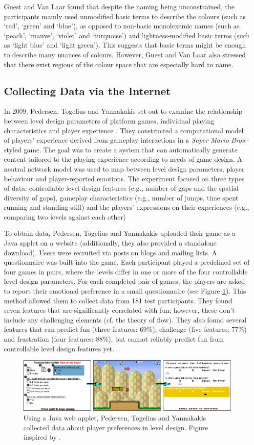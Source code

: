 Guest and Van Laar found that despite the naming being unconstrained, the participants mainly used unmodified basic terms to describe the colours (such as `red', `green' and `blue'), as opposed to non-basic monolexemic names (such as `peach', `mauve', `violet' and `turquoise') and lightness-modified basic terms (such as `light blue' and `light green'). This suggests that basic terms might be enough to describe many nuances of colours. However, Guest and Van Laar also stressed that there exist regions of the colour space that are especially hard to name.

\subsection{Collecting Data via the Internet}


In 2009, Pedersen, Togelius and Yannakakis set out to examine the relationship between level design parameters of platform games, individual playing characteristics and player experience \cite{marioModel}. They constructed a computational model of players' experience derived from gameplay interactions in a \textit{Super Mario Bros.}-styled game. The goal was to create a system that can automatically generate content tailored to the playing experience according to needs of game design.  A neutral network model was used to map between level design parameters, player behaviour and player-reported emotions. The experiment focused on three types of data: controllable level design features (e.g., number of gaps and the spatial diversity of gaps), gameplay characteristics (e.g., number of jumps, time spent running and standing still) and the players' expressions on their experiences (e.g., comparing two levels against each other)

To obtain data, Pedersen, Togelius and Yannakakis uploaded their game as a Java applet on a website (additionally, they also provided a standalone download). Users were recruited via posts on blogs and mailing lists. A questionnaire was built into the game. Each participant played a predefined set of four games in pairs, where the levels differ in one or more of the four controllable level design parameters. For each completed pair of games, the players are asked to report their emotional preference in a small questionnaire (see Figure \ref{fig:mario}). This method allowed them to collect data from 181 test participants. They found seven features that are significantly correlated with fun; however, these don't include any challenging elements (cf. the theory of flow). They also found several features that can predict fun (three features: 69\%), challenge (five features: 77\%) and frustration (four features: 88\%), but cannot reliably predict fun from controllable level design features yet.

\begin{figure}[htbp]
\centering
\includegraphics[width=1\textwidth]{Pics/mario_all}
\caption{Using a Java web applet, Pedersen, Togelius and Yannakakis collected data about player preferences in level design. Figure inspired by \cite{marioModel}.}
\label{fig:mario}
\end{figure}
